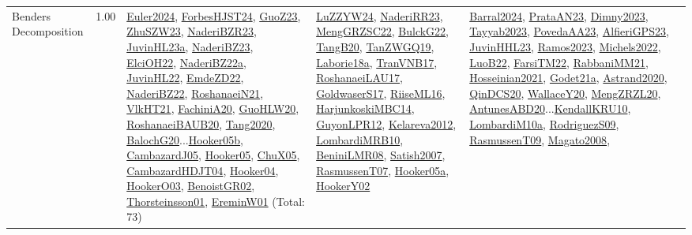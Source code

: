 {\begin{longtable}{p{3cm}r>{\raggedright\arraybackslash}p{6cm}>{\raggedright\arraybackslash}p{6cm}>{\raggedright\arraybackslash}p{8cm}}
\index{Benders Decomposition}\index{Concepts!Benders Decomposition}Benders Decomposition &  1.00 & \hyperref[detail:Euler2024]{Euler2024}, \hyperref[detail:ForbesHJST24]{ForbesHJST24}, \hyperref[detail:GuoZ23]{GuoZ23}, \hyperref[detail:ZhuSZW23]{ZhuSZW23}, \hyperref[detail:NaderiBZR23]{NaderiBZR23}, \hyperref[detail:JuvinHL23a]{JuvinHL23a}, \hyperref[detail:NaderiBZ23]{NaderiBZ23}, \hyperref[detail:ElciOH22]{ElciOH22}, \hyperref[detail:NaderiBZ22a]{NaderiBZ22a}, \hyperref[detail:JuvinHL22]{JuvinHL22}, \hyperref[detail:EmdeZD22]{EmdeZD22}, \hyperref[detail:NaderiBZ22]{NaderiBZ22}, \hyperref[detail:RoshanaeiN21]{RoshanaeiN21}, \hyperref[detail:VlkHT21]{VlkHT21}, \hyperref[detail:FachiniA20]{FachiniA20}, \hyperref[detail:GuoHLW20]{GuoHLW20}, \hyperref[detail:RoshanaeiBAUB20]{RoshanaeiBAUB20}, \hyperref[detail:Tang2020]{Tang2020}, \hyperref[detail:BalochG20]{BalochG20}...\hyperref[detail:Hooker05b]{Hooker05b}, \hyperref[detail:CambazardJ05]{CambazardJ05}, \hyperref[detail:Hooker05]{Hooker05}, \hyperref[detail:ChuX05]{ChuX05}, \hyperref[detail:CambazardHDJT04]{CambazardHDJT04}, \hyperref[detail:Hooker04]{Hooker04}, \hyperref[detail:HookerO03]{HookerO03}, \hyperref[detail:BenoistGR02]{BenoistGR02}, \hyperref[detail:Thorsteinsson01]{Thorsteinsson01}, \hyperref[detail:EreminW01]{EreminW01} (Total: 73) & \hyperref[detail:LuZZYW24]{LuZZYW24}, \hyperref[detail:NaderiRR23]{NaderiRR23}, \hyperref[detail:MengGRZSC22]{MengGRZSC22}, \hyperref[detail:BulckG22]{BulckG22}, \hyperref[detail:TangB20]{TangB20}, \hyperref[detail:TanZWGQ19]{TanZWGQ19}, \hyperref[detail:Laborie18a]{Laborie18a}, \hyperref[detail:TranVNB17]{TranVNB17}, \hyperref[detail:RoshanaeiLAU17]{RoshanaeiLAU17}, \hyperref[detail:GoldwaserS17]{GoldwaserS17}, \hyperref[detail:RiiseML16]{RiiseML16}, \hyperref[detail:HarjunkoskiMBC14]{HarjunkoskiMBC14}, \hyperref[detail:GuyonLPR12]{GuyonLPR12}, \hyperref[detail:Kelareva2012]{Kelareva2012}, \hyperref[detail:LombardiMRB10]{LombardiMRB10}, \hyperref[detail:BeniniLMR08]{BeniniLMR08}, \hyperref[detail:Satish2007]{Satish2007}, \hyperref[detail:RasmussenT07]{RasmussenT07}, \hyperref[detail:Hooker05a]{Hooker05a}, \hyperref[detail:HookerY02]{HookerY02} & \hyperref[detail:Barral2024]{Barral2024}, \hyperref[detail:PrataAN23]{PrataAN23}, \hyperref[detail:Dimny2023]{Dimny2023}, \hyperref[detail:Tayyab2023]{Tayyab2023}, \hyperref[detail:PovedaAA23]{PovedaAA23}, \hyperref[detail:AlfieriGPS23]{AlfieriGPS23}, \hyperref[detail:JuvinHHL23]{JuvinHHL23}, \hyperref[detail:Ramos2023]{Ramos2023}, \hyperref[detail:Michels2022]{Michels2022}, \hyperref[detail:LuoB22]{LuoB22}, \hyperref[detail:FarsiTM22]{FarsiTM22}, \hyperref[detail:RabbaniMM21]{RabbaniMM21}, \hyperref[detail:Hosseinian2021]{Hosseinian2021}, \hyperref[detail:Godet21a]{Godet21a}, \hyperref[detail:Astrand2020]{Astrand2020}, \hyperref[detail:QinDCS20]{QinDCS20}, \hyperref[detail:WallaceY20]{WallaceY20}, \hyperref[detail:MengZRZL20]{MengZRZL20}, \hyperref[detail:AntunesABD20]{AntunesABD20}...\hyperref[detail:KendallKRU10]{KendallKRU10}, \hyperref[detail:LombardiM10a]{LombardiM10a}, \hyperref[detail:RodriguezS09]{RodriguezS09}, \hyperref[detail:RasmussenT09]{RasmussenT09}, \hyperref[detail:Magato2008]{Magato2008}, 
\end{longtable}}
